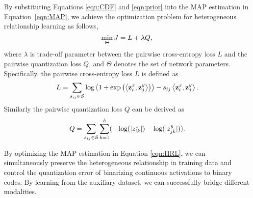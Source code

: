 \documentclass{article}
\begin{document}
By substituting Equations \eqref{eqn:CDF} and \eqref{eqn:prior} into the MAP estimation in Equation~\eqref{eqn:MAP}, we achieve the optimization problem for heterogeneous relationship learning as follows,
\begin{equation}\label{eqn:HRL}
\mathop {\min }\limits_\Theta  J = L + \lambda Q, \\
\end{equation}
where $\lambda$ is trade-off parameter between the pairwise cross-entropy loss $L$ and the pairwise quantization loss $Q$, and $\Theta  $ denotes the set of network parameters. Specifically, the pairwise cross-entropy loss $L$ is defined as
\begin{equation}\label{eqn:heteoL}
  {L} = \sum\limits_{s_{ij}\in{\cal S}} \log \left( {1 + \exp \left( {\left\langle {{\bf{z}}_i^x,{\bf{z}}_j^y} \right\rangle } \right)} \right) - {s_{ij}}\left\langle {{\bf{z}}_i^x,{\bf{z}}_j^y} \right\rangle. \\
\end{equation}
Similarly the pairwise quantization loss $Q$ can be derived as
\begin{equation}\label{eqn:heteQ}
  {Q} = \sum\limits_{s_{ij}\in{\cal S}} \sum\limits_{k = 1}^b (-\log ( {| {z_{ik}^x} |}) - \log ( {| {z_{jk}^y} |})).
\end{equation}

By optimizing the MAP estimation in Equation \eqref{eqn:HRL}, we can simultaneously preserve the heterogeneous relationship in training data and control the quantization error of binarizing continuous activations to binary codes. By learning from the auxiliary dataset, we can successfully bridge different modalities.
\end{document}
